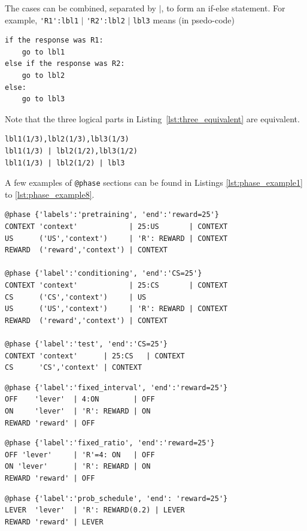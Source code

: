 \documentclass[11pt]{article}
\begin{document}
The cases can be combined, separated by $|$, to form an if-else statement. For example,
\verb|'R1':lbl1| $|$ \verb|'R2':lbl2| $|$ \verb|lbl3| means (in psedo-code)
\begin{verbatim}
if the response was R1:
    go to lbl1
else if the response was R2:
    go to lbl2
else:
    go to lbl3    
\end{verbatim}
Note that the three logical parts in Listing~\ref{lst:three_equivalent} are equivalent.
\begin{lstlisting}[caption={Three equivalent logical parts}, label={lst:three_equivalent}]
lbl1(1/3),lbl2(1/3),lbl3(1/3)
lbl1(1/3) | lbl2(1/2),lbl3(1/2)
lbl1(1/3) | lbl2(1/2) | lbl3
\end{lstlisting}
A few examples of \verb|@phase| sections can be found in Listings \ref{lst:phase_example1} to \ref{lst:phase_example8}.

\belowcaptionskip=-10pt
\begin{lstlisting}[caption={Three \texttt{@phase} sections for classical conditioning}, label=lst:phase_example1]
@phase {'labels':'pretraining', 'end':'reward=25'}
CONTEXT	'context'            | 25:US       | CONTEXT
US      ('US','context')     | 'R': REWARD | CONTEXT
REWARD  ('reward','context') | CONTEXT

@phase {'label':'conditioning', 'end':'CS=25'}
CONTEXT 'context'            | 25:CS       | CONTEXT
CS      ('CS','context')     | US
US      ('US','context')     | 'R': REWARD | CONTEXT
REWARD  ('reward','context') | CONTEXT

@phase {'label':'test', 'end':'CS=25'}
CONTEXT 'context'      | 25:CS   | CONTEXT
CS      'CS','context' | CONTEXT
\end{lstlisting}

\begin{lstlisting}[caption={A \texttt{@phase} section for fixed interval}, label=lst:phase_example2]
@phase {'label':'fixed_interval', 'end':'reward=25'}
OFF    'lever'  | 4:ON        | OFF
ON     'lever'  | 'R': REWARD | ON
REWARD 'reward' | OFF
\end{lstlisting}

\begin{lstlisting}[caption={A \texttt{@phase} section for fixed ratio}, label=lst:phase_example3]
@phase {'label':'fixed_ratio', 'end':'reward=25'}
OFF 'lever'     | 'R'=4: ON   | OFF
ON 'lever'      | 'R': REWARD | ON 
REWARD 'reward' | OFF
\end{lstlisting}

\begin{lstlisting}[caption={A \texttt{@phase} section using a probability schedule}, label=lst:phase_example4]
@phase {'label':'prob_schedule', 'end': 'reward=25'}
LEVER  'lever'  | 'R': REWARD(0.2) | LEVER  
REWARD 'reward' | LEVER  
\end{lstlisting}
\end{document}

